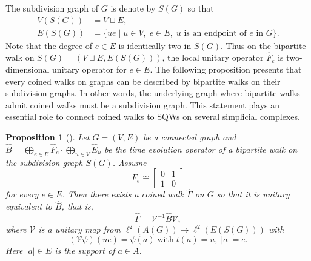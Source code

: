 \documentclass[a4paper,12pt]{article}
\newtheorem{proposition}[definition]{Proposition}
\numberwithin{equation}{section}
\begin{document}
The subdivision graph of $G$ is denote by $S(G)$ so that 
\begin{align*} 
V(S(G)) &= V\sqcup E, \\ 
E(S(G)) &= \{ue\;|\; u\in V,\; e\in E,\; u \text{ is an endpoint of } e \text{ in }G\}. 
\end{align*}
Note that the degree of $e\in E$ is identically two in $S(G)$. Thus on the bipartite walk on $S(G)=(V\sqcup E,E(S(G)))$, 
the local unitary operator $\hat{F}_e$ is two-dimensional unitary operator for $e\in E$. 
%
The following proposition presents that every coined walks on graphs can be described by bipartite walks on their subdivision graphs.
In other words, the underlying graph where bipartite walks admit coined walks must be a subdivision graph.
This statement plays an essential role to connect coined walks to SQWs on several simplicial complexes.

\begin{proposition}[\cite{PS}]
\label{bipartitecoind}
Let $G=(V,E)$ be a connected graph and $\hat{B}=\bigoplus_{e\in E}\hat{F}_e\cdot \bigoplus_{u\in V}\hat{E}_u$ be the time evolution operator of a bipartite walk on the subdivision graph $S(G)$. 
Assume 
	\[ F_e\cong \begin{bmatrix} 0 & 1 \\ 1 & 0 \end{bmatrix}\] 
for every $e\in E$. 
Then there exists a coined walk $\hat{\Gamma}$ on $G$ so that it is unitary equivalent to $\hat{B}$, that is, 
 	\[ \hat{\Gamma}=\mathcal{V}^{-1} \hat{B} \mathcal{V}, \] 
where $\mathcal{V}$ is a unitary map from $\ell^2(A(G)) \to \ell^2(E(S(G)))$ with 
	\[ (\mathcal{V}\psi)(ue)=\psi(a) \mathrm{\;with\;} t(a)=u,\; |a|=e. \]
Here $|a|\in E$ is the support of $a\in A$. 
\end{proposition}
%
\end{document}
